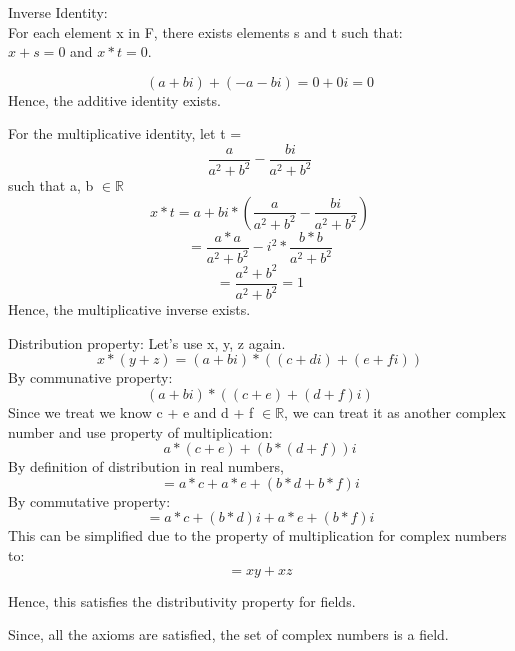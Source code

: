 \documentclass[12pt]{article}
\begin{document}
\begin{enumerate}
    Inverse Identity: \\
    For each element x in F, there exists elements s and t such that: \\
    $x + s = 0$ and $x * t = 0$.
    
    \begin{equation}
        (a + bi) + (-a - bi) = 0 + 0i = 0
    \end{equation}
    Hence, the additive identity exists. 

    For the multiplicative identity, let t = 
    \begin{equation}
        \frac{a}{a^2 + b^2} - \frac{bi}{a^2 + b^2}
    \end{equation}
    such that a, b $\in \mathbb{R}$ 
    \begin{equation}
        x * t = a + bi * (\frac{a}{a^2 + b^2} - \frac{bi}{a^2 + b^2})
    \end{equation}
    \begin{equation}
        = \frac{a * a}{a^2 + b^2} - i^2 * \frac{b*b}{a^2 + b^2}
    \end{equation}
    \begin{equation}
        = \frac{a^2+b^2}{a^2 + b^2} = 1
    \end{equation}
    Hence, the multiplicative inverse exists.

    Distribution property:
    Let's use x, y, z again. 
    \begin{equation}
        x * (y + z) = (a + bi) * ((c + di) + (e + fi))
    \end{equation}
    By communative property:
    \begin{equation}
        (a + bi) * ((c + e) + (d + f)i)
    \end{equation}
    Since we treat we know c + e and d + f $\in \mathbb{R}$, we can treat it as another complex number and use property of multiplication:
    \begin{equation}
        a * (c + e) + (b * (d + f))i
    \end{equation}
    By definition of distribution in real numbers, 
    \begin{equation}
        = a * c + a * e + (b * d + b * f)i  
    \end{equation}
    By commutative property: 
    \begin{equation}
        = a * c + (b * d)i + a * e + (b * f)i
    \end{equation}
    This can be simplified due to the property of multiplication for complex numbers to:
    \begin{equation}
        =xy + xz
    \end{equation}

    Hence, this satisfies the distributivity property for fields.

    Since, all the axioms are satisfied, the set of complex numbers is a field. \qedsymbol{}
\end{enumerate}
\end{document}
